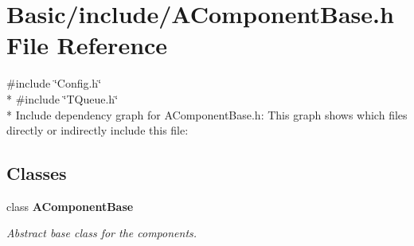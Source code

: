 \section{Basic/include/\-A\-Component\-Base.h File Reference}
\label{AComponentBase_8h}
{\ttfamily \#include \char`\"{}Config.\-h\char`\"{}}\\*
{\ttfamily \#include \char`\"{}T\-Queue.\-h\char`\"{}}\\*
Include dependency graph for A\-Component\-Base.\-h\-:
This graph shows which files directly or indirectly include this file\-:
\subsection*{Classes}
\begin{DoxyCompactItemize}
\item 
class {\bf A\-Component\-Base}
\begin{DoxyCompactList}\small\item\em Abstract base class for the components. \end{DoxyCompactList}\end{DoxyCompactItemize}
